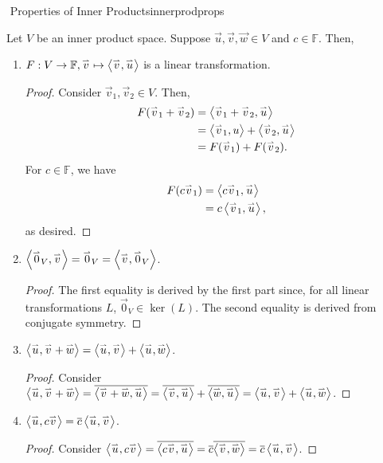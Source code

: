         \begin{theorem}{\Stop\,\,Properties of Inner Products}{innerprodprops}

            Let \(V\) be an inner product space. Suppose \(\vec{u},\vec{v},\vec{w}\in V\) and \(c\in\mathbb{F}\). Then,
            \begin{enumerate}
                \item \(F:V\to \mathbb{F},\vec{v}\mapsto\iprod{\vec{v}}{\vec{u}}\) is a linear transformation.
                \begin{proof}
                    Consider \(\vec{v}_1,\vec{v}_2\in V\). Then,
                    \begin{align*}
                        F(\vec{v}_1+\vec{v}_2)&=\iprod{\vec{v}_1+\vec{v}_2}{\vec{u}} \\
                        &=\iprod{\vec{v}_1}{u}+\iprod{\vec{v}_2}{\vec{u}} \\
                        &=F(\vec{v}_1)+F(\vec{v}_2).
                    \end{align*}
                    For \(c\in\mathbb{F}\), we have
                    \begin{align*}
                        F(c\vec{v}_1)&=\iprod{c\vec{v}_1}{\vec{u}} \\
                        &=c\iprod{\vec{v}_1}{\vec{u}},
                    \end{align*}
                    as desired.
                \end{proof}
                \item \(\iprod{\vec{0}_V}{\vec{v}}=\vec{0}_V=\iprod{\vec{v}}{\vec{0}_V}\).
                \begin{proof}
                    The first equality is derived by the first part since, for all linear transformations \(L\), \(\vec{0}_V\in\ker(L)\). The second equality is derived from conjugate symmetry.
                \end{proof}
                \item \(\iprod{\vec{u}}{\vec{v}+\vec{w}}=\iprod{\vec{u}}{\vec{v}}+\iprod{\vec{u}}{\vec{w}}\).
                \begin{proof}
                    Consider \(\iprod{\vec{u}}{\vec{v}+\vec{w}}=\bar{\iprod{\vec{v}+\vec{w}}{\vec{u}}}=\bar{\iprod{\vec{v}}{\vec{u}}}+\bar{\iprod{\vec{w}}{\vec{u}}}=\iprod{\vec{u}}{\vec{v}}+\iprod{\vec{u}}{\vec{w}}\).
                \end{proof}
                \item \(\iprod{\vec{u}}{c\vec{v}}=\bar{c}\iprod{\vec{u}}{\vec{v}}\).
                \begin{proof}
                    Consider \(\iprod{\vec{u}}{c\vec{v}}=\bar{\iprod{c\vec{v}}{\vec{u}}}=\bar{c}\bar{\iprod{\vec{v}}{\vec{w}}}=\bar{c}\iprod{\vec{u}}{\vec{v}}\).
                \end{proof}
            \end{enumerate}
            
        \end{theorem}
